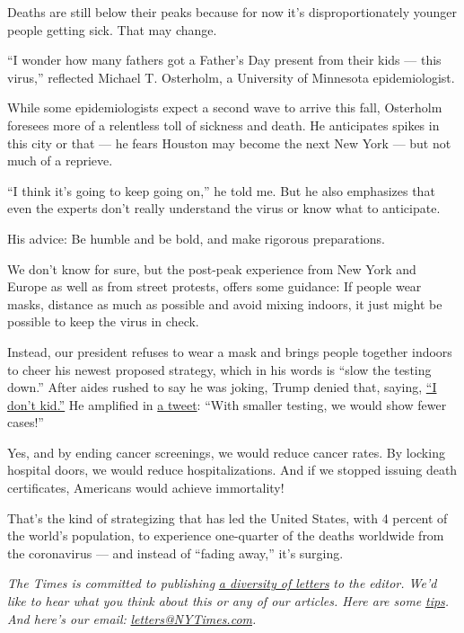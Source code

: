 Deaths are still below their peaks because for now it's
disproportionately younger people getting sick. That may change.

``I wonder how many fathers got a Father's Day present from their kids
--- this virus,'' reflected Michael T. Osterholm, a University of
Minnesota epidemiologist.

While some epidemiologists expect a second wave to arrive this fall,
Osterholm foresees more of a relentless toll of sickness and death. He
anticipates spikes in this city or that --- he fears Houston may become
the next New York --- but not much of a reprieve.

``I think it's going to keep going on,'' he told me. But he also
emphasizes that even the experts don't really understand the virus or
know what to anticipate.

His advice: Be humble and be bold, and make rigorous preparations.

We don't know for sure, but the post-peak experience from New York and
Europe as well as from street protests, offers some guidance: If people
wear masks, distance as much as possible and avoid mixing indoors, it
just might be possible to keep the virus in check.

Instead, our president refuses to wear a mask and brings people together
indoors to cheer his newest proposed strategy, which in his words is
``slow the testing down.'' After aides rushed to say he was joking,
Trump denied that, saying,
\href{https://www.cbsnews.com/news/trump-slow-down-testing-coronavirus-i-dont-kid/}{``I
don't kid.''} He amplified in
\href{https://twitter.com/realDonaldTrump/status/1275381670561095682}{a
tweet}: ``With smaller testing, we would show fewer cases!''

Yes, and by ending cancer screenings, we would reduce cancer rates. By
locking hospital doors, we would reduce hospitalizations. And if we
stopped issuing death certificates, Americans would achieve immortality!

That's the kind of strategizing that has led the United States, with 4
percent of the world's population, to experience one-quarter of the
deaths worldwide from the coronavirus --- and instead of ``fading
away,'' it's surging.

\emph{The Times is committed to publishing}
\href{https://www.nytimes3xbfgragh.onion/2019/01/31/opinion/letters/letters-to-editor-new-york-times-women.html}{\emph{a
diversity of letters}} \emph{to the editor. We'd like to hear what you
think about this or any of our articles. Here are some}
\href{https://help.nytimes3xbfgragh.onion/hc/en-us/articles/115014925288-How-to-submit-a-letter-to-the-editor}{\emph{tips}}\emph{.
And here's our email:}
\href{mailto:letters@NYTimes.com}{\emph{letters@NYTimes.com}}\emph{.}

